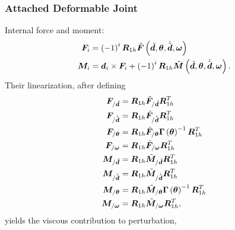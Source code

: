\documentclass[10pt,fleqn,subeqn]{report}
\newcommand{\T}[1]{\bm{#1}}
\begin{document}
\subsubsection{Attached Deformable Joint}
Internal force and moment:
\begin{subequations}
\begin{align}
	\T{F}_i &= \plbr{ -1 }^i \T{R}_{1h} \tilde{\T{F}}\plbr{\tilde{\T{d}}, \T{\theta}, \dot{\tilde{\T{d}}}, \T{\omega}} \\
	\T{M}_i &= \T{d}_i \times \T{F}_i
	+ \plbr{-1}^i \T{R}_{1h} \tilde{\T{M}}\plbr{\tilde{\T{d}}, \T{\theta}, \dot{\tilde{\T{d}}}, \T{\omega}} .
\end{align}
\end{subequations}
Their linearization, after defining
\begin{subequations}
\begin{align}
	\T{F}_{/\tilde{\T{d}}} &=
		\T{R}_{1h} \tilde{\T{F}}_{/\tilde{\T{d}}} \T{R}_{1h}^T \\
	\T{F}_{/\dot{\tilde{\T{d}}}} &=
		\T{R}_{1h} \tilde{\T{F}}_{/\dot{\tilde{\T{d}}}} \T{R}_{1h}^T \\
	\T{F}_{/\T{\theta}}
		&= \T{R}_{1h} \tilde{\T{F}}_{/\T{\theta}} \T{\Gamma}\plbr{\T{\theta}}^{-1} \T{R}_{1h}^T \\
	\T{F}_{/\T{\omega}}
		&= \T{R}_{1h} \tilde{\T{F}}_{/\T{\omega}} \T{R}_{1h}^T \\
	\T{M}_{/\tilde{\T{d}}} &=
		\T{R}_{1h} \tilde{\T{M}}_{/\tilde{\T{d}}} \T{R}_{1h}^T \\
	\T{M}_{/\dot{\tilde{\T{d}}}} &=
		\T{R}_{1h} \tilde{\T{M}}_{/\dot{\tilde{\T{d}}}} \T{R}_{1h}^T \\
	\T{M}_{/\T{\theta}}
		&= \T{R}_{1h} \tilde{\T{M}}_{/\T{\theta}} \T{\Gamma}\plbr{\T{\theta}}^{-1} \T{R}_{1h}^T \\
	\T{M}_{/\T{\omega}}
		&= \T{R}_{1h} \tilde{\T{M}}_{/\T{\omega}} \T{R}_{1h}^T ,
\end{align}
\end{subequations}
yields the viscous contribution to perturbation,
\end{document}
